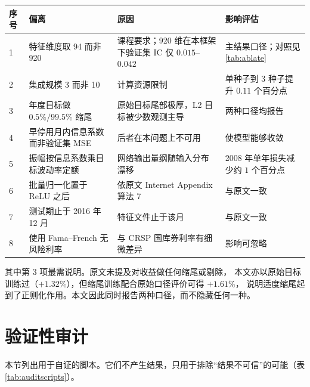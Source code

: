 \documentclass[11pt,a4paper,fontset=windows]{ctexart}
\begin{document}
\begin{table}[htbp]
\centering
\small
\begin{tabular}{p{0.5cm}p{4.4cm}p{4.4cm}p{4.4cm}}
\toprule
序号 & 偏离 & 原因 & 影响评估 \\
\midrule
1 & 特征维度取 94 而非 920 & 课程要求；920 维在本框架下验证集 IC 仅 $0.015$--$0.042$ & 主结果口径；对照见 \ref{tab:ablate} \\
2 & 集成规模 3 而非 10 & 计算资源限制 & 单种子到 3 种子提升 $0.11$ 个百分点 \\
3 & 年度目标做 $0.5\%/99.5\%$ 缩尾 & 原始目标尾部极厚，L2 目标被少数观测主导 & 两种口径均报告 \\
4 & 早停用月内信息系数而非验证集 MSE & 后者在本问题上不可用 & 使模型能够收敛 \\
5 & 振幅按信息系数乘目标波动率定额 & 网络输出量纲随输入分布漂移 & 2008 年单年损失减少约 $1$ 个百分点 \\
6 & 批量归一化置于 ReLU 之后 & 依原文 Internet Appendix 算法 7 & 与原文一致 \\
7 & 测试期止于 2016 年 12 月 & 特征文件止于该月 & 与原文一致 \\
8 & 使用 Fama--French 无风险利率 & 与 CRSP 国库券利率有细微差异 & 影响可忽略 \\
\bottomrule
\end{tabular}
\end{table}

其中第 3 项最需说明。原文未提及对收益做任何缩尾或剔除，
本文亦以原始目标训练过（$+1.32\%$），但缩尾训练配合原始口径评价可得 $+1.61\%$，
说明适度缩尾起到了正则化作用。本文因此同时报告两种口径，而不隐藏任何一种。

\section{验证性审计}\label{app:audit}

本节列出用于自证的脚本。它们不产生结果，只用于排除``结果不可信''的可能（表 \ref{tab:auditscripts}）。
\end{document}
